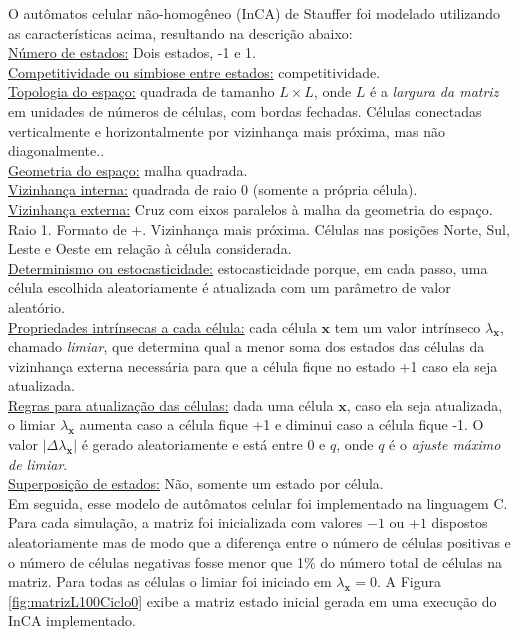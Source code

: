 \documentclass[11pt,a4paper,twocolumn,final]{article}
\begin{document}
O autômatos celular não-homogêneo (InCA) de Stauffer foi modelado utilizando as características acima, resultando na descrição abaixo:\\
\underline{Número de estados:} Dois estados, -1 e 1.\\
\underline{Competitividade ou simbiose entre estados:} competitividade.\\
\underline{Topologia do espaço:} quadrada de tamanho $L\times L$, onde $L$ é a \textit{largura da matriz} em unidades de números de células, com bordas fechadas. Células conectadas verticalmente e horizontalmente por vizinhança mais próxima, mas não diagonalmente..\\
\underline{Geometria do espaço:} malha quadrada.\\
\underline{Vizinhança interna:} quadrada de raio 0 (somente a própria célula).\\
\underline{Vizinhança externa:} Cruz com eixos paralelos à malha da geometria do espaço. Raio 1. Formato de +. Vizinhança mais próxima. Células nas posições Norte, Sul, Leste e Oeste em relação à célula considerada.\\
\underline{Determinismo ou estocasticidade:} estocasticidade porque, em cada passo, uma célula escolhida aleatoriamente é atualizada com um parâmetro de valor aleatório.\\
\underline{Propriedades intrínsecas a cada célula:} cada célula $\mathbf{x}$ tem um valor intrínseco $\lambda_\mathbf{x}$, chamado \textit{limiar}, que determina qual a menor soma dos estados das células da vizinhança externa necessária para que a célula fique no estado +1 caso ela seja atualizada.\\
\underline{Regras para atualização das células:}  dada uma célula $\mathbf{x}$, caso ela seja atualizada, o limiar $\lambda_\mathbf{x}$ aumenta caso a célula fique +1 e diminui caso a célula fique -1. O valor $|\Delta\lambda_\mathbf{x}|$ é gerado aleatoriamente e está entre $0$ e $q$, onde $q$ é o \textit{ajuste máximo de limiar}.\\
\underline{Superposição de estados:} Não, somente um estado por célula.\\


Em seguida, esse modelo de autômatos celular foi implementado na linguagem C. Para cada simulação, a matriz foi inicializada com valores $-1$ ou $+1$ dispostos aleatoriamente mas de modo que a diferença entre o número de células positivas e o número de células negativas fosse menor que 1\% do número total de células na matriz. Para todas as células o limiar foi iniciado em $\lambda_\mathbf{x} = 0$. A Figura \ref{fig:matrizL100Ciclo0} exibe a matriz estado inicial gerada em uma execução do InCA implementado.
\end{document}
